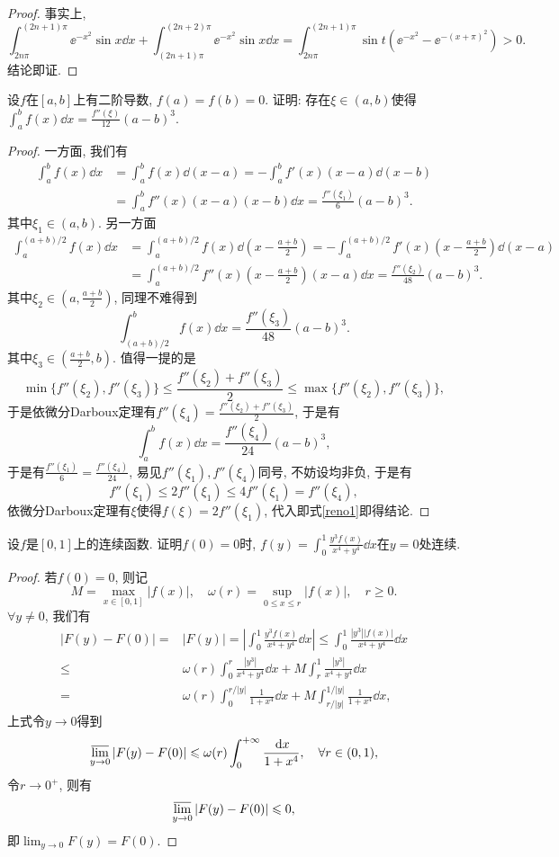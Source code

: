 \begin{quiza}
\begin{proof}
事实上,\[\int_{2n\pi}^{(2n+1)\pi}\ee^{-x^2}\sin x\dd x+\int_{(2n+1)\pi}^{(2n+2)\pi}\ee^{-x^2}\sin x\dd x=\int_{2n\pi}^{(2n+1)\pi}\sin t\left(\ee^{-x^2}-\ee^{-(x+\pi)^2}\right)>0.\]结论即证.
\end{proof}
\woe 设\(f\)在\([a,b]\)上有二阶导数, \(f(a)=f(b)=0\). 证明: 存在\(\xi\in(a,b)\)使得\(\int_{a}^{b}f(x)\dd x=\frac{f''(\xi)}{12}(a-b)^3.\)
\begin{proof}
一方面, 我们有
\begin{equation}\tag{$\blacklozenge$}\label{reno1}
\begin{split}
\int_{a}^{b}f(x)\dd x&=\int_{a}^{b}f(x)\dd(x-a)=-\int_{a}^{b}f'(x)(x-a)\dd (x-b)\\&=\int_{a}^{b}f''(x)(x-a)(x-b)\dd x=\frac{f''(\xi_1)}{6}(a-b)^3.
\end{split}
\end{equation}
其中\(\xi_1\in(a,b)\). 另一方面\[\begin{split}
\int_{a}^{(a+b)/2}f(x)\dd x&=\int_{a}^{(a+b)/2}f(x)\dd\left(x-\frac{a+b}{2}\right)=-\int_{a}^{(a+b)/2}f'(x)\left(x-\frac{a+b}{2}\right)\dd (x-a)\\&=\int_{a}^{(a+b)/2}f''(x)\left(x-\frac{a+b}{2}\right)(x-a)\dd x=\frac{f''(\xi_2)}{48}(a-b)^3.
\end{split}\]其中\(\xi_2\in\left(a,\frac{a+b}{2}\right)\), 同理不难得到\[\int_{(a+b)/2}^{b}f(x)\dd x=\frac{f''(\xi_3)}{48}(a-b)^3.\]其中\(\xi_3\in\left(\frac{a+b}{2},b\right)\). 值得一提的是\[\min\{f''(\xi_2),f''(\xi_3)\}\leqslant\frac{f''(\xi_2)+f''(\xi_3)}{2}\leqslant\max\{f''(\xi_2),f''(\xi_3)\},\] 于是依微分Darboux定理有\(f''(\xi_4)=\frac{f''(\xi_2)+f''(\xi_3)}{2}\), 于是有\[\int_{a}^{b}f(x)\dd x=\frac{f''(\xi_4)}{24}(a-b)^3,\] 于是有\(\frac{f''(\xi_1)}{6}=\frac{f''(\xi_4)}{24}\), 易见\(f''(\xi_1),f''(\xi_4)\)同号, 不妨设均非负, 于是有\[f''(\xi_1)\leqslant 2f''(\xi_1)\leqslant  4f''(\xi_1)=f''(\xi_4),\]依微分Darboux定理有\(\xi\)使得\(f(\xi)=2f''(\xi_1)\), 代入即式\eqref{reno1}即得结论.
\end{proof}
\woe 设\(f\)是\([0,1]\)上的连续函数. 证明\(f(0)=0\)时, \(f(y)=\int_{0}^{1}\frac{y^3f(x)}{x^4+y^4}\dd x\)在\(y=0\)处连续.
\begin{proof}
若\(f(0)=0\), 则记\[M=\max_{x\in[0,1]}\left|f(x)\right|,\quad\omega(r)=\sup_{0\leqslant x\leqslant r}\left|f(x)\right|,\quad r\geqslant 0.\]
\(\forall y\ne 0\), 我们有\[\begin{split}
\left|F(y)-F(0)\right|=&\left|F(y)\right|=\left|\int_{0}^{1}\frac{y^3f(x)}{x^4+y^4}\dd x\right|\leqslant\int_{0}^{1}\frac{|y^3||f(x)|}{x^4+y^4}\dd x\\\leqslant&\omega(r)\int_{0}^{r}\frac{|y^3|}{x^4+y^4}\dd x+M\int_{r}^{1}\frac{|y^3|}{x^4+y^4}\dd x\\=&\omega(r)\int_{0}^{r/|y|}\frac{1}{1+x^4}\dd x+M\int_{r/|y|}^{1/|y|}\frac{1}{1+x^4}\dd x,
\end{split}\]上式令\(y\rightarrow 0\)得到\[\varlimsup_{y\rightarrow 0}|F(y)-F(0)|\leqslant\omega(r)\int_{0}^{+\infty}\frac{\,\mathrm{d} x}{1+x^4},\quad\forall r\in (0,1),\]令\(r\rightarrow 0^+\), 则有\[\varlimsup_{y\rightarrow 0}|F(y)-F(0)|\leqslant 0,\]即\(\lim_{y\rightarrow 0}F(y)=F(0).\)


\end{proof}
\end{quiza}

